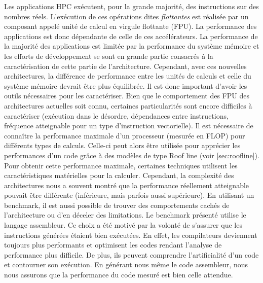     Les applications HPC exécutent, pour la grande majorité, des instructions sur des nombres réels. L'exécution de ces opérations dites \textit{flottantes} est réalisée par un composant appelé unité de calcul en virgule flottante (FPU). La performance des applications est donc dépendante de celle de ces accélérateurs. La performance de la majorité des applications est limitée par la performance du système mémoire et les efforts de développement se sont en grande partie consacrés à la caractérisation de cette partie de l’architecture. Cependant, avec ces nouvelles architectures, la différence de performance entre les unités de calculs et celle du système mémoire devrait être plus équilibrée. Il est donc important d'avoir les outils nécessaires pour les caractériser.
    Bien que le comportement des FPU des architectures actuelles soit connu,  certaines particularités sont encore difficiles à caractériser (exécution dans le désordre, dépendances entre instructions, fréquence atteignable pour un type d'instruction vectorielle). 
    Il est nécessaire de connaître la performance maximale d'un processeur (mesurée en FLOP) pour différents types de calculs. Celle-ci peut alors être utilisée pour apprécier les performances d'un code grâce à des modèles de type Roof line (voir \autoref{sec:roofline}). Pour obtenir cette performance maximale, certaines techniques utilisent les caractéristiques matérielles pour la calculer. Cependant, la complexité des architectures nous a souvent montré que la performance réellement atteignable pouvait être différente (inférieure, mais parfois aussi supérieure). En utilisant un benchmark, il est aussi possible de trouver des comportements cachés de l'architecture ou d'en déceler des limitations. 
    Le benchmark présenté utilise le langage assembleur. Ce choix a été motivé par la volonté de s'assurer que les instructions générées étaient bien exécutées. En effet, les compilateurs deviennent toujours plus performants et optimisent les codes rendant l'analyse de performance plus difficile. De plus, ils peuvent comprendre l'artificialité d'un code et contourner son exécution. En générant nous même le code assembleur, nous nous assurons que la performance du code mesuré est bien celle attendue.
    


   
    
    
    
